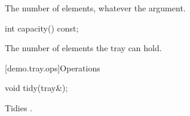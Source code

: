 \begin{itemdescr}
\pnum
\returns
The number of elements, whatever the argument.
\end{itemdescr}

%
\begin{itemdecl}
int capacity() const;
\end{itemdecl}

\begin{itemdescr}
\pnum
\returns
The number of elements the tray can hold.
\end{itemdescr}

[demo.tray.ops]{Operations}

%
\begin{itemdecl}
void tidy(tray&);
\end{itemdecl}

\begin{itemdescr}
\pnum
\effects
Tidies .
\end{itemdescr}
